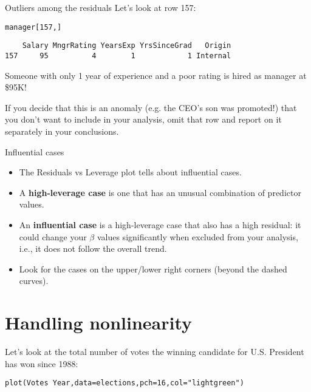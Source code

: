 \documentclass{beamer}\usepackage[]{graphicx}\usepackage[]{color}
\makeatletter
\newcommand{\hlnum}[1]{\textcolor[rgb]{0.824,0.412,0.118}{#1}}%
\newcommand{\hlstr}[1]{\textcolor[rgb]{1,0.894,0.71}{#1}}%
\newcommand{\hlopt}[1]{\textcolor[rgb]{1,0.894,0.769}{#1}}%
\newcommand{\hlstd}[1]{\textcolor[rgb]{1,0.894,0.769}{#1}}%
\newcommand{\hlkwc}[1]{\textcolor[rgb]{0.78,0.941,0.545}{#1}}%
\newcommand{\hlkwd}[1]{\textcolor[rgb]{1,0.78,0.769}{#1}}%
\newenvironment{kframe}{%
 \def\at@end@of@kframe{}%
 \ifinner\ifhmode%
  \def\at@end@of@kframe{\end{minipage}}%
  \begin{minipage}{\columnwidth}%
 \fi\fi%
 \def\FrameCommand##1{\hskip\@totalleftmargin \hskip-\fboxsep
 \colorbox{shadecolor}{##1}\hskip-\fboxsep
     \hskip-\linewidth \hskip-\@totalleftmargin \hskip\columnwidth}%
 \MakeFramed {\advance\hsize-\width
   \@totalleftmargin\z@ \linewidth\hsize
   \@setminipage}}%
 {\par\unskip\endMakeFramed%
 \at@end@of@kframe}
\newenvironment{knitrout}{}{} %
\makeatother
\begin{document}
\begin{darkframes}
    \begin{frame}[fragile]{Outliers among the residuals}
      Let's look at row 157:
\begin{knitrout}
\begin{kframe}
\begin{alltt}
\hlstd{manager[}\hlnum{157}\hlstd{,]}
\end{alltt}
\begin{verbatim}
    Salary MngrRating YearsExp YrsSinceGrad   Origin
157     95          4        1            1 Internal
\end{verbatim}
\end{kframe}
\end{knitrout}
      Someone with only 1 year of experience and a poor rating is hired as manager at \$95K! \pause \bigskip

      If you decide that this is an anomaly (e.g. the CEO's son was promoted!) that you don't want to include in your analysis, omit that row and report on it separately in your conclusions.
    \end{frame}

    \begin{frame}[fragile]{Influential cases}
      \begin{itemize}[<+->]
        \item The Residuals vs Leverage plot tells about \alert{influential cases}.
        \item A \textbf{high-leverage case} is one that has an unusual combination of predictor values.
        \item An \textbf{influential case} is a high-leverage case that also has a high residual: it could change your $\beta$ values significantly when excluded from your analysis, i.e., it does not follow the overall trend.
        \item Look for the cases on the upper/lower right corners (beyond the dashed curves).
      \end{itemize}
    \end{frame}

    \section{Handling nonlinearity}

    \begin{frame}[fragile]
      Let's look at the total number of votes the winning candidate for U.S. President has won since 1988:
\begin{knitrout}
\begin{kframe}
\begin{alltt}
\hlkwd{plot}\hlstd{(Votes} \hlopt{~} \hlstd{Year,} \hlkwc{data}\hlstd{=elections,} \hlkwc{pch}\hlstd{=}\hlnum{16}\hlstd{,} \hlkwc{col}\hlstd{=}\hlstr{"lightgreen"}\hlstd{)}
\end{alltt}
\end{kframe}



\end{knitrout}
\end{frame}
\end{darkframes}
\end{document}
